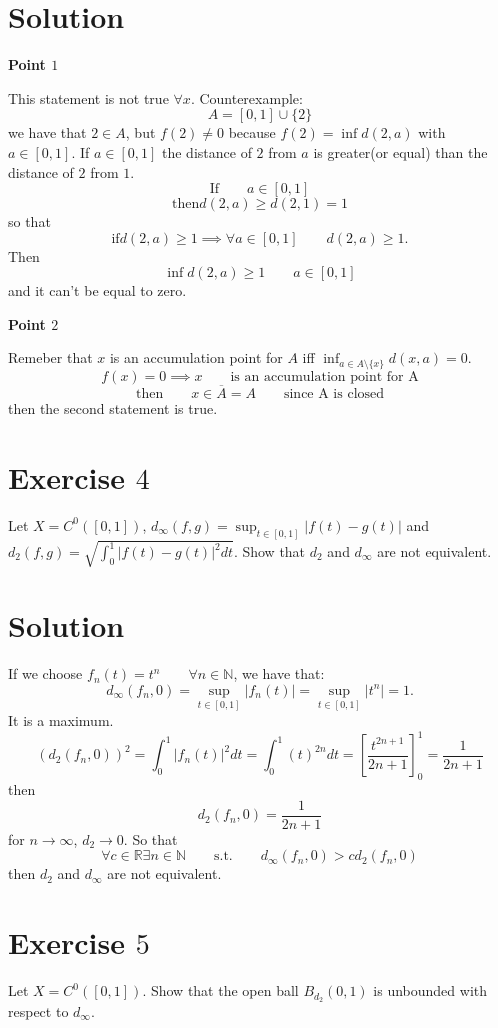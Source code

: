 \documentclass[a4paper, twoside, openany]{book}
\begin{document}
\section*{Solution}
\textbf{Point $1$} \par  
This statement is not true $\forall x$. Counterexample:
$$A = [0, 1] \cup \{ 2 \}$$
we have that $2 \in A$, but $f(2) \neq 0$ because $f(2) = \inf d(2, a)$ with $a \in [0, 1]$. If $a \in [0,1]$ the distance of $2$ from $a$ is greater(or equal) than the distance of $2$ from $1$.
$$\textrm{If} \qquad a \in [0, 1]$$
$$\textrm{then} d(2, a) \geq d(2, 1) = 1$$
so that
$$\textrm{if} d(2, a) \geq 1 \implies \forall a \in [0, 1] \qquad d(2, a) \geq 1.$$
Then
$$\inf d(2, a) \geq 1 \qquad a \in [0, 1]$$
and it can't be equal to zero. \par 
\textbf{Point $2$} \par   
Remeber that $x$ is an accumulation point for $A$ iff $\inf_{a \in A \setminus \{ x \}} d(x, a) = 0$.
$$f(x) = 0 \implies x \qquad \textrm{is an accumulation point for A}$$
$$\textrm{then} \qquad x \in \overline{A} = A \qquad \textrm{since A is closed}$$
then the second statement is true.
\clearpage
\section*{Exercise $4$}
Let $X = C^0([0, 1])$, $d_{\infty}(f, g) = \sup_{t \in [0,1]} |f(t) - g(t)|$ and $d_2(f, g) = \sqrt{\int_0^1 |f(t) - g(t)|^2 dt}$. Show that $d_2$ and $d_{\infty}$ are not equivalent.
\section*{Solution}
If we choose $f_n(t) = t^n \qquad \forall n \in \mathbb{N}$, we have that:
$$d_{\infty}(f_n, 0) = \sup_{t \in [0, 1]} |f_n(t)| = \sup_{t \in [0, 1]} |t^n| = 1.$$
It is a maximum.
$$(d_2(f_n, 0))^2 = \int_0^1 |f_n(t)|^2 dt = \int_0^1 (t)^{2 n} dt = [ \frac{t^{2n + 1}}{2n + 1}]_0^1 = \frac{1}{2n + 1}$$
then
$$d_2(f_n, 0) = \frac{1}{2n + 1}$$
for $n \rightarrow \infty$, $d_2 \rightarrow 0$. So that
$$\forall c \in \mathbb{R} \exists n \in \mathbb{N} \qquad \textrm{s.t.} \qquad d_{\infty}(f_n, 0) > c d_2(f_n, 0)$$
then $d_2$ and $d_{\infty}$ are not equivalent.
\clearpage
\section*{Exercise $5$}
Let $X = C^0([0, 1])$. Show that the open ball $B_{d_2}(0,1)$ is unbounded with respect to $d_{\infty}$.
\end{document}
